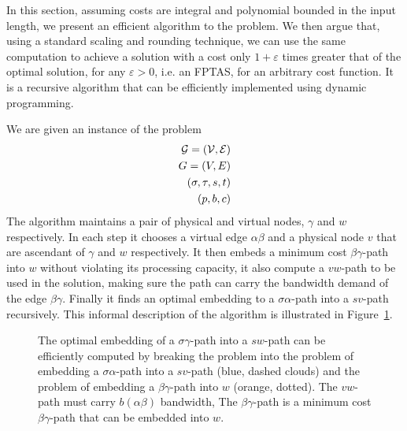 In this section, 
assuming costs are integral and polynomial bounded in the input length,
we present an efficient algorithm to the \VPN{} problem.
We then argue that, using a standard scaling and rounding technique, we can use
the same computation to achieve a solution with a cost only
$1 + \varepsilon$ times greater that of the optimal solution, for any
$\varepsilon > 0$, i.e. an FPTAS, for an arbitrary cost function.
It is a recursive algorithm that can be efficiently implemented using dynamic
programming.

We are given an instance of the \VPN{} problem 
\begin{align*}
\mathcal{G} = (\mathcal{V}, \mathcal{E})		\\
G = (V, E)		\\
(\sigma , \tau , s, t)	\\
(p, b, c)
\end{align*}
The algorithm maintains a pair of physical and virtual nodes,
$\gamma$ and $w$ respectively.
In each step it chooses a virtual edge $\alpha\beta$ and a physical node $v$
that are ascendant of $\gamma$ and $w$ respectively.
It then embeds a minimum cost $\beta\gamma$-path into $w$ 
without violating its processing capacity,
it also compute a $vw$-path to be used in the solution, 
making sure the path can carry the bandwidth demand of the edge $\beta\gamma$.
Finally it finds an optimal embedding to a $\sigma\alpha$-path into a $sv$-path 
recursively.
This informal description of the algorithm is illustrated in Figure~\ref{fig:dp1}.

\begin{figure}[ht]
\centering

\caption[]{
\label{fig:dp1}
The optimal embedding of a $\sigma \gamma $-path into a $sw$-path can be
efficiently computed by breaking the problem into the problem of embedding 
a $\sigma\alpha$-path into a $sv$-path (blue, dashed clouds) 
and the problem of embedding a $\beta\gamma$-path into $w$ (orange, dotted).
The $vw$-path must carry $b(\alpha\beta)$ bandwidth, 
The $\beta\gamma$-path is a minimum cost $\beta\gamma$-path 
that can be embedded into $w$.
}
\end{figure}

